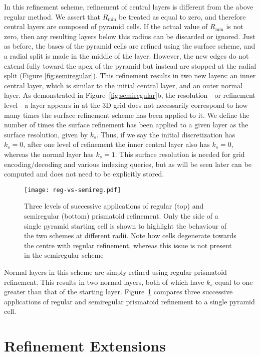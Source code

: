 In this refinement scheme, refinement of central layers is different from the above regular method.
We assert that $R_\mathrm{min}$ be treated as equal to zero, and therefore central layers are composed of pyramid cells.
If the actual value of $R_\mathrm{min}$ is not zero, then any resulting layers below this radius can be discarded or ignored.
Just as before, the bases of the pyramid cells are refined using the surface scheme, and a radial split is made in the middle of the layer.
However, the new edges do not extend fully toward the apex of the pyramid but instead are stopped at the radial split (Figure \ref{fig:semiregular}).
This refinement results in two new layers: an inner central layer, which is similar to the initial central layer, and an outer normal layer.
As demonstrated in Figure~\ref{fig:semiregular}b, the resolution---or refinement level---a layer appears in at the 3D grid does not necessarily correspond to how many times the surface refinement scheme has been applied to it.
We define the number of times the surface refinement has been applied to a given layer as the surface resolution, given by $k_s$.
Thus, if we say the initial discretization has $k_s = 0$, after one level of refinement the inner central layer also has $k_s = 0$, whereas the normal layer has $k_s = 1$.
This surface resolution is needed for grid encoding/decoding and various indexing queries, but as will be seen later can be computed and does not need to be explicitly stored.


\begin{figure}[h]
	\centering
	\texttt{[image: reg-vs-semireg.pdf]}
	\caption{Three levels of successive applications of regular (top) and semiregular (bottom) prismatoid refinement.
		Only the side of a single pyramid starting cell is shown to highlight the behaviour of the two schemes at different radii.
		Note how cells degenerate towards the centre with regular refinement, whereas this issue is not present in the semiregular scheme}
	\label{fig:regVsemireg}
\end{figure}


Normal layers in this scheme are simply refined using regular prismatoid refinement.
This results in two normal layers, both of which have $k_s$ equal to one greater than that of the starting layer.
Figure~\ref{fig:regVsemireg} compares three successive applications of regular and semiregular prismatoid refinement to a single pyramid cell.

\section{Refinement Extensions}
